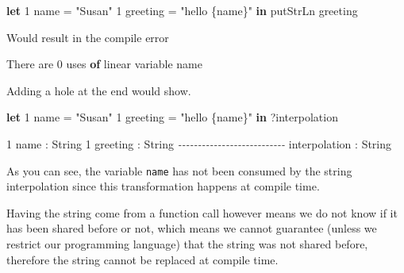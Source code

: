 \documentclass[
]{article}
\newenvironment{Shaded}{}{}
\newcommand{\CommentTok}[1]{\textcolor[rgb]{0.38,0.63,0.69}{\textit{#1}}}
\newcommand{\DataTypeTok}[1]{\textcolor[rgb]{0.56,0.13,0.00}{#1}}
\newcommand{\DecValTok}[1]{\textcolor[rgb]{0.25,0.63,0.44}{#1}}
\newcommand{\FunctionTok}[1]{\textcolor[rgb]{0.02,0.16,0.49}{#1}}
\newcommand{\KeywordTok}[1]{\textcolor[rgb]{0.00,0.44,0.13}{\textbf{#1}}}
\newcommand{\NormalTok}[1]{#1}
\newcommand{\OperatorTok}[1]{\textcolor[rgb]{0.40,0.40,0.40}{#1}}
\newcommand{\OtherTok}[1]{\textcolor[rgb]{0.00,0.44,0.13}{#1}}
\newcommand{\StringTok}[1]{\textcolor[rgb]{0.25,0.44,0.63}{#1}}
\begin{document}
\begin{Shaded}
\begin{Highlighting}[]
\KeywordTok{let} \DecValTok{1}\NormalTok{ name }\OtherTok{=} \StringTok{"Susan"}
    \DecValTok{1}\NormalTok{ greeting }\OtherTok{=} \StringTok{"hello \{name\}"} \KeywordTok{in}
    \FunctionTok{putStrLn}\NormalTok{ greeting}
\end{Highlighting}
\end{Shaded}

Would result in the compile error

\begin{Shaded}
\begin{Highlighting}[]
\DataTypeTok{There}\NormalTok{ are }\DecValTok{0}\NormalTok{ uses }\KeywordTok{of}\NormalTok{ linear variable name}
\end{Highlighting}
\end{Shaded}

Adding a hole at the end would show.

\begin{Shaded}
\begin{Highlighting}[]
\KeywordTok{let} \DecValTok{1}\NormalTok{ name }\OtherTok{=} \StringTok{"Susan"}
    \DecValTok{1}\NormalTok{ greeting }\OtherTok{=} \StringTok{"hello \{name\}"} \KeywordTok{in}
    \OperatorTok{?}\NormalTok{interpolation}
\end{Highlighting}
\end{Shaded}

\begin{Shaded}
\begin{Highlighting}[]
\DecValTok{1}\NormalTok{ name }\OperatorTok{:} \DataTypeTok{String}
\DecValTok{1}\NormalTok{ greeting }\OperatorTok{:} \DataTypeTok{String}
\CommentTok{{-}{-}{-}{-}{-}{-}{-}{-}{-}{-}{-}{-}{-}{-}{-}{-}{-}{-}{-}{-}{-}{-}{-}{-}{-}{-}{-}}
\NormalTok{interpolation }\OperatorTok{:} \DataTypeTok{String}
\end{Highlighting}
\end{Shaded}

As you can see, the variable \texttt{name} has not been consumed by the
string interpolation since this transformation happens at compile time.

Having the string come from a function call however means we do not know
if it has been shared before or not, which means we cannot guarantee
(unless we restrict our programming language) that the string was not
shared before, therefore the string cannot be replaced at compile time.
\end{document}
